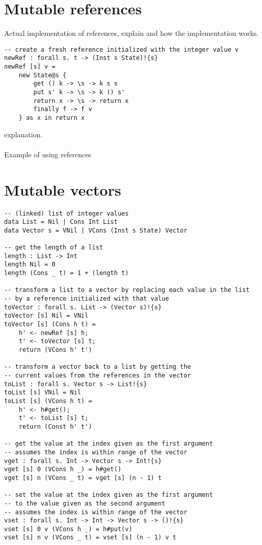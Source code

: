\section{Mutable references}
Actual implementation of references, explain \ident{[s]} and how the implementation works.

\begin{verbatim}
-- create a fresh reference initialized with the integer value v
newRef : forall s. t -> (Inst s State)!{s}
newRef [s] v =
	new State@s {
		get () k -> \s -> k s s
		put s' k -> \s -> k () s'
		return x -> \s -> return x
		finally f -> f v
	} as x in return x
\end{verbatim}
explanation.
\\\\
Example of using references

\section{Mutable vectors}
\begin{verbatim}
-- (linked) list of integer values
data List = Nil | Cons Int List
data Vector s = VNil | VCons (Inst s State) Vector

-- get the length of a list
length : List -> Int
length Nil = 0
length (Cons _ t) = 1 + (length t)

-- transform a list to a vector by replacing each value in the list
-- by a reference initialized with that value
toVector : forall s. List -> (Vector s)!{s}
toVector [s] Nil = VNil
toVector [s] (Cons h t) =
	h' <- newRef [s] h;
	t' <- toVector [s] t;
	return (VCons h' t')

-- transform a vector back to a list by getting the
-- current values from the references in the vector
toList : forall s. Vector s -> List!{s}
toList [s] VNil = Nil
toList [s] (VCons h t) =
	h' <- h#get();
	t' <- toList [s] t;
	return (Const h' t')

-- get the value at the index given as the first argument
-- assumes the index is within range of the vector
vget : forall s. Int -> Vector s -> Int!{s}
vget [s] 0 (VCons h _) = h#get()
vget [s] n (VCons _ t) = vget [s] (n - 1) t

-- set the value at the index given as the first argument
-- to the value given as the second argument
-- assumes the index is within range of the vector
vset : forall s. Int -> Int -> Vector s -> ()!{s}
vset [s] 0 v (VCons h _) = h#put(v)
vset [s] n v (VCons _ t) = vset [s] (n - 1) v t
\end{verbatim}

